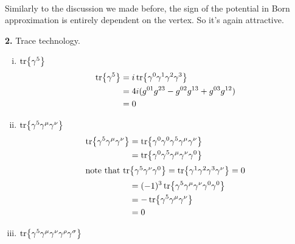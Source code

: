 \documentclass{article}
\newcommand{\gm}{\gamma^{\mu}}
\newcommand{\gn}{\gamma^{\nu}}
\newcommand{\gs}{\gamma^{\sigma}}
\newcommand{\gr}{\gamma^{\rho}}
\newcommand{\g}{\gamma}
\newcommand{\s}{\sigma}
\newcommand{\ps}{\slashed p}
\newcommand{\ks}{\slashed k}
\begin{document}
\begin{enumerate}[(i)]
\begin{enumerate}[(a)]
\begin{align*}
    \end{align*}
    Similarly to the discussion we made before, the sign of the potential in Born approximation is entirely dependent on the vertex. So it's again attractive.
  \end{enumerate}
\end{enumerate}

{\bf2.}\quad
Trace technology.
\begin{enumerate}[(i)]
  \item $\tr{\g^5}$
  \begin{align*}
    \tr{\g^5}&=i\tr{\g^0\g^1\g^2\g^3}\\
    &=4i(g^{01}g^{23}-g^{02}g^{13}+g^{03}g^{12})\\
    &=0
  \end{align*}
  \item $\tr{\g^5\gm\gn}$
  \begin{align*}
    \tr{\g^5\gm\gn}&=\tr{\g^0\g^0\g^5\gm\gn}\\
    &=\tr{\g^0\g^5\gm\gn\g^0}\\
    \intertext{note that $\tr{\g^5\gn\g^0}=\tr{\g^1\g^2\g^3\gn}=0$}
    &=(-1)^3\tr{\g^5\gm\gn\g^0\g^0}\\
    &=-\tr{\g^5\gm\gn}\\
    &=0
  \end{align*}
  \item $\tr{\g^5\gm\gn\gr\gs}$


\end{enumerate}
\end{document}
